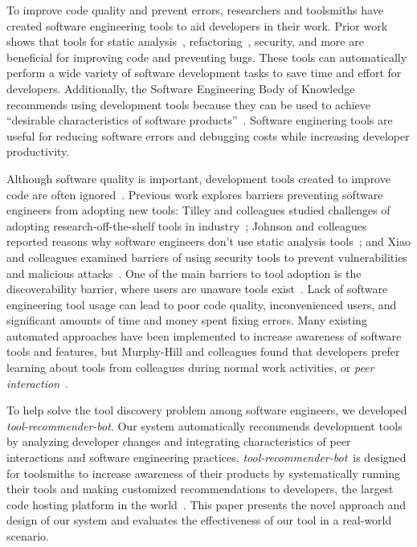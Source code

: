 \documentclass[sigconf,review,anonymous]{acmart}
\newcommand{\tool}{\textsl{tool-recommender-bot}}
\begin{document}
To improve code quality and prevent errors, researchers and toolsmiths have created software engineering tools to aid developers in their work. Prior work shows that tools for static analysis~\cite{UsingStaticAnalysis}, refactoring~\cite{Murphy-HillFitness}, security, and more are beneficial for improving code and preventing bugs. These tools can automatically perform a wide variety of software development tasks to save time and effort for developers. Additionally, the Software Engineering Body of Knowledge recommends using development tools because they can be used to achieve ``desirable characteristics of software products''~\cite{SWEBOK}. Software enginering tools are useful for reducing software errors and debugging costs while increasing developer productivity.

Although software quality is important, development tools created to improve code are often ignored~\cite{Ivanov2017Gaps}. Previous work explores barriers preventing software engineers from adopting new tools: Tilley and colleagues studied challenges of adopting research-off-the-shelf tools in industry~\cite{Tilley2003ROTS}; Johnson and colleagues reported reasons why software engineers don't use static analysis tools~\cite{Johnson2013Why}; and Xiao and colleagues examined barriers of using security tools to prevent vulnerabilities and malicious attacks~\cite{Xiao2014Security}. One of the main barriers to tool adoption is the discoverability barrier, where users are unaware tools exist~\cite{Murphy-HillScreencastingDiscovery}. Lack of software engineering tool usage can lead to poor code quality, inconvenienced users, and significant amounts of time and money spent fixing errors. Many existing automated approaches have been implemented to increase awareness of software tools and features, but Murphy-Hill and colleagues found that developers prefer learning about tools from colleagues during normal work activities, or \textit{peer interaction}~\cite{MurphyHill2011PeerInteraction}.

To help solve the tool discovery problem among software engineers, we developed \tool. Our system automatically recommends development tools by analyzing developer changes and integrating characteristics of peer interactions and software engineering practices. \tool~is designed for toolsmiths to increase awareness of their products by systematically running their tools and making customized recommendations to developers, the largest code hosting platform in the world~\cite{GousiosGitHub}. This paper presents the novel approach and design of our system and evaluates the effectiveness of our tool in a real-world scenario.
\end{document}
